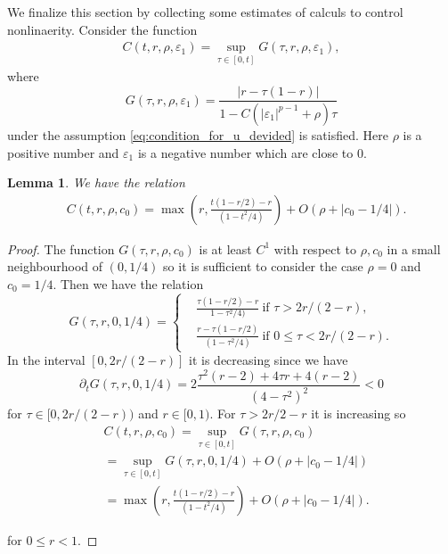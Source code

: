 \documentclass[reqno]{amsart}
\newtheorem{Lemma}[Theorem]{Lemma}
\begin{document}
We finalize this section
by collecting some estimates of calculs to control nonlinaerity.
Consider the function
	\begin{align}\label{eq.dC}
	C(t,r,\rho,\varepsilon_1)
	= \sup_{\tau \in [0,t]} G(\tau,r,\rho,\varepsilon_1),
	\end{align}
where
	\[
	G(\tau,r,\rho,\varepsilon_1)
	= \frac{ |r - \tau(1 - r)|}{1-C ( |\varepsilon_1|^{p-1} + \rho ) \tau}
	\]
under the assumption \eqref{eq:condition_for_u_devided} is satisfied.
Here $\rho$ is a positive number and $\varepsilon_1$ is a negative number
which are close to $0$.

\begin{Lemma}\label{l.61}
We have the relation
\begin{equation}
\begin{aligned}
& C(t,r,\rho,c_0) =  \max \left(r , \frac{t(1-r/2)-r }{(1-t^2/4)} \right)+ O(\rho+|c_0-1/4|).
\end{aligned}
\end{equation}   
\end{Lemma}

\begin{proof}
    The function $G(\tau,r,\rho,c_0)$ is at least $C^1$ with respect  to $\rho, c_0$ in a small neighbourhood of $(0,1/4)$ so it is sufficient to consider the case $\rho=0$ and $c_0=1/4.$
Then we have the relation
\begin{equation}
  G(\tau,r,0,1/4) = \left\{ \begin{aligned}
    &\frac{ \tau(1-r/2)-r}{1- \tau^2/4)}  \ \mbox{if $\tau>2r/(2-r)$},\\
    & \frac{ r-\tau(1-r/2)}{(1-\tau^2/4)} \ \mbox{if $0 \leq \tau<2r/(2-r)$}.
  \end{aligned}\right.  
\end{equation}
In the interval $[0,2r/(2-r)]$ it is decreasing since 
we have
\begin{equation}
    \partial_t G(\tau,r,0,1/4) = 2\frac{\tau^2(r-2) + 4\tau r +4(r-2) }{(4-\tau^2)^2} < 0 
\end{equation}
for $\tau \in [0,2r/(2-r))$ and $r \in [0,1).$ For $\tau > 2r/2-r$ it is increasing so
\begin{equation}
\begin{aligned}
    & C(t,r,\rho,c_0) =  \sup_{\tau \in [0,t]}  G(\tau,r,\rho,c_0) \\
    &  = \sup_{\tau \in [0,t]} G(\tau,r,0,1/4)+ O(\rho+|c_0-1/4|)\\
    & = \max \left(r , \frac{t(1-r/2)-r }{(1-t^2/4)} \right)+ O(\rho+|c_0-1/4|).
\end{aligned}
\end{equation}



for $0\leq r < 1$.
\end{proof}
\end{document}
